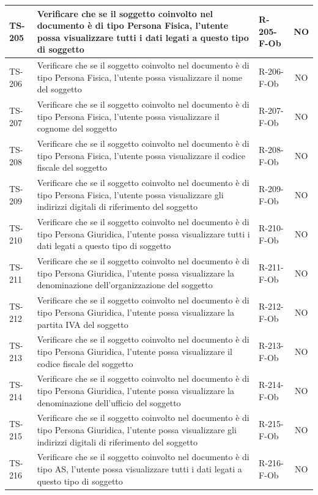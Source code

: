 \documentclass[a4paper,12pt]{article}
\begin{document}
\begin{longtable}{|p{1.5cm}|p{8.3cm}|p{2.4cm}|c|}
\hline
TS-205 & Verificare che se il soggetto coinvolto nel documento è di tipo Persona Fisica, l'utente possa visualizzare tutti i dati legati a questo tipo di soggetto & R-205-F-Ob & NO \\
\hline
TS-206 & Verificare che se il soggetto coinvolto nel documento è di tipo Persona Fisica, l'utente possa visualizzare il nome del soggetto & R-206-F-Ob & NO \\
\hline
TS-207 & Verificare che se il soggetto coinvolto nel documento è di tipo Persona Fisica, l'utente possa visualizzare il cognome del soggetto & R-207-F-Ob & NO \\
\hline
TS-208 & Verificare che se il soggetto coinvolto nel documento è di tipo Persona Fisica, l'utente possa visualizzare il codice fiscale del soggetto & R-208-F-Ob & NO \\
\hline
TS-209 & Verificare che se il soggetto coinvolto nel documento è di tipo Persona Fisica, l'utente possa visualizzare gli indirizzi digitali di riferimento del soggetto & R-209-F-Ob & NO \\
\hline
TS-210 & Verificare che se il soggetto coinvolto nel documento è di tipo Persona Giuridica, l'utente possa visualizzare tutti i dati legati a questo tipo di soggetto & R-210-F-Ob & NO \\
\hline
TS-211 & Verificare che se il soggetto coinvolto nel documento è di tipo Persona Giuridica, l'utente possa visualizzare la denominazione dell'organizzazione del soggetto & R-211-F-Ob & NO \\
\hline
TS-212 & Verificare che se il soggetto coinvolto nel documento è di tipo Persona Giuridica, l'utente possa visualizzare la partita IVA del soggetto & R-212-F-Ob & NO \\
\hline
TS-213 & Verificare che se il soggetto coinvolto nel documento è di tipo Persona Giuridica, l'utente possa visualizzare il codice fiscale del soggetto & R-213-F-Ob & NO \\
\hline
TS-214 & Verificare che se il soggetto coinvolto nel documento è di tipo Persona Giuridica, l'utente possa visualizzare la denominazione dell'ufficio del soggetto & R-214-F-Ob & NO \\
\hline
TS-215 & Verificare che se il soggetto coinvolto nel documento è di tipo Persona Giuridica, l'utente possa visualizzare gli indirizzi digitali di riferimento del soggetto & R-215-F-Ob & NO \\
\hline
TS-216 & Verificare che se il soggetto coinvolto nel documento è di tipo AS, l'utente possa visualizzare tutti i dati legati a questo tipo di soggetto & R-216-F-Ob & NO \\

\end{longtable}
\end{document}
